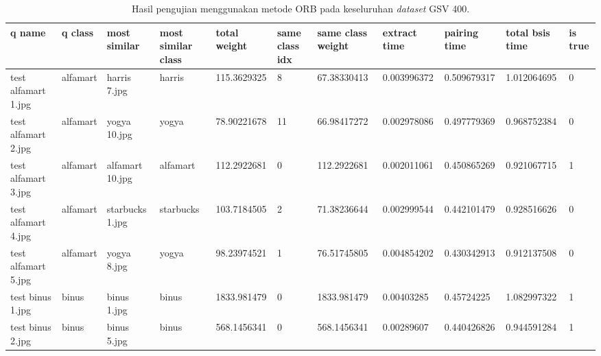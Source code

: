 \begin{landscape}
	\begin{longtable}{|p{2cm}|p{1.5cm}|p{2cm}|p{1.5cm}|p{2cm}|p{1cm}|p{2cm}|p{2cm}|p{2cm}|p{2cm}|p{1cm}|}
		\caption{Hasil pengujian menggunakan metode ORB pada keseluruhan \textit{dataset} GSV 400.} \\
		\hline
		\textbf{q name}      & \textbf{q class} & \textbf{most similar} & \textbf{most similar class} & \textbf{total weight} & \textbf{same class idx} & \textbf{same class weight} & \textbf{extract time} & \textbf{pairing time} & \textbf{total bsis time} & \textbf{is true} \\ \hline
		test alfamart 1.jpg  & alfamart         & harris 7.jpg          & harris                      & 115.3629325           & 8                       & 67.38330413                & 0.003996372           & 0.509679317           & 1.012064695              & 0                \\ \hline
		test alfamart 2.jpg  & alfamart         & yogya 10.jpg          & yogya                       & 78.90221678           & 11                      & 66.98417272                & 0.002978086           & 0.497779369           & 0.968752384              & 0                \\ \hline
		test alfamart 3.jpg  & alfamart         & alfamart 10.jpg       & alfamart                    & 112.2922681           & 0                       & 112.2922681                & 0.002011061           & 0.450865269           & 0.921067715              & 1                \\ \hline
		test alfamart 4.jpg  & alfamart         & starbucks 1.jpg       & starbucks                   & 103.7184505           & 2                       & 71.38236644                & 0.002999544           & 0.442101479           & 0.928516626              & 0                \\ \hline
		test alfamart 5.jpg  & alfamart         & yogya 8.jpg           & yogya                       & 98.23974521           & 1                       & 76.51745805                & 0.004854202           & 0.430342913           & 0.912137508              & 0                \\ \hline
		test binus 1.jpg     & binus            & binus 1.jpg           & binus                       & 1833.981479           & 0                       & 1833.981479                & 0.00403285            & 0.45724225            & 1.082997322              & 1                \\ \hline
		test binus 2.jpg     & binus            & binus 5.jpg           & binus                       & 568.1456341           & 0                       & 568.1456341                & 0.00289607            & 0.440426826           & 0.944591284              & 1                \\ \hline

\end{longtable}
\end{landscape}
